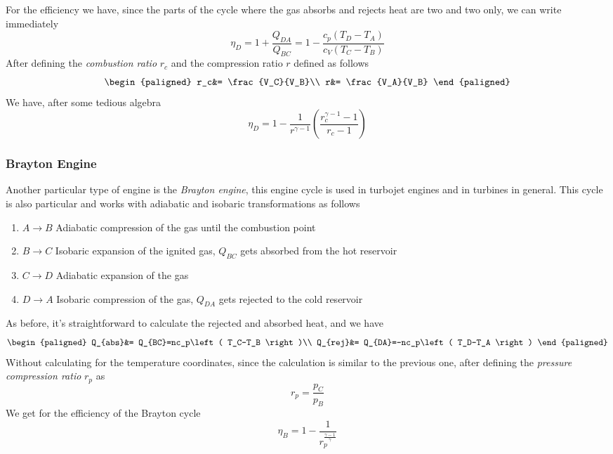 \documentclass[../qm.tex]{subfiles}
\begin{document}
For the efficiency we have, since the parts of the cycle where the gas absorbs and rejects heat are two and two only, we can write immediately
\begin{equation}
	\eta_D=1+\frac{Q_{DA}}{Q_{BC}}=1-\frac{c_p\left( T_D-T_A \right)}{c_V\left( T_C-T_B \right)}
	\label{eq:effdiesel1.eng}
\end{equation}
After defining the \emph{combustion ratio} $r_c$ and the compression ratio $r$ defined as follows
\begin{equation}
	\begin{paligned}
		r_c&= \frac{V_C}{V_B}\\
		r&= \frac{V_A}{V_B}
	\end{paligned}
	\label{eq:compratiosdis.eng}
\end{equation}
We have, after some tedious algebra
\begin{equation}
	\eta_D=1-\frac{1}{r^{\gamma-1}}\left( \frac{r_c^{\gamma-1}-1}{r_c-1} \right)
	\label{eq:dieseleff.eng}
\end{equation}
\subsubsection{Brayton Engine}
Another particular type of engine is the \emph{Brayton engine}, this engine cycle is used in turbojet engines and in turbines in general. This cycle is also particular and works with adiabatic and isobaric transformations as follows
\begin{enumerate}
\item $A\to B$ Adiabatic compression of the gas until the combustion point
\item $B\to C$ Isobaric expansion of the ignited gas, $Q_{BC}$ gets absorbed from the hot reservoir
\item $C\to D$ Adiabatic expansion of the gas
\item $D\to A$ Isobaric compression of the gas, $Q_{DA}$ gets rejected to the cold reservoir
\end{enumerate}
As before, it's straightforward to calculate the rejected and absorbed heat, and we have
\begin{equation}
	\begin{paligned}
		Q_{abs}&= Q_{BC}=nc_p\left( T_C-T_B \right)\\
		Q_{rej}&= Q_{DA}=-nc_p\left( T_D-T_A \right)
	\end{paligned}
	\label{eq:heatsbrayton.eng}
\end{equation}
Without calculating for the temperature coordinates, since the calculation is similar to the previous one, after defining the \emph{pressure compression ratio} $r_p$ as
\begin{equation}
	r_p=\frac{p_C}{p_B}
	\label{eq:pressurecompratio}
\end{equation}
We get for the efficiency of the Brayton cycle
\begin{equation}
	\eta_B=1-\frac{1}{r_p^{\frac{\gamma-1}{\gamma}}}
	\label{eq:braytoneff.eng}
\end{equation}
\end{document}
